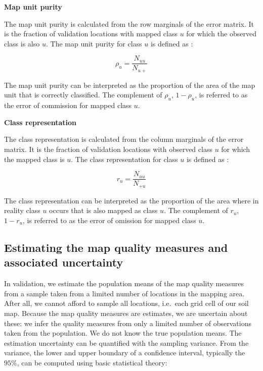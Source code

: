 \documentclass[10pt,b5paper,]{book}
\theoremstyle{definition}
\theoremstyle{definition}
\theoremstyle{definition}
\theoremstyle{remark}
\begin{document}
\textbf{Map unit purity}

The map unit purity is calculated from the row marginals of the error
matrix. It is the fraction of validation locations with mapped class
\(u\) for which the observed class is also \(u\). The map unit purity
for class \(u\) is defined as \citep{brus2011sampling}:

\begin{equation}
\rho_u = \frac{ N_{uu}}{N_{u+}}
\end{equation}

The map unit purity can be interpreted as the proportion of the area of
the map unit that is correctly classified. The complement of \(\rho_u\),
\(1 - \rho_u\), is referred to as the error of commission for mapped
class \(u\).

\textbf{Class representation}

The class representation is calculated from the column marginals of the
error matrix. It is the fraction of validation locations with observed
class \(u\) for which the mapped class is \(u\). The class
representation for class \(u\) is defined as \citep{brus2011sampling}:

\begin{equation}
r_u = \frac{ N_{uu}}{N_{+u}}
\end{equation}

The class representation can be interpreted as the proportion of the
area where in reality class \(u\) occurs that is also mapped as class
\(u\). The complement of \(r_u\), \(1 - r_u\), is referred to as the
error of omission for mapped class \(u\).

\hypertarget{estimating-the-map-quality-measures-and-associated-uncertainty}{%
\subsection{Estimating the map quality measures and associated
uncertainty}\label{estimating-the-map-quality-measures-and-associated-uncertainty}}

In validation, we estimate the population means of the map quality
measures from a sample taken from a limited number of locations in the
mapping area. After all, we cannot afford to sample all locations,
i.e.~each grid cell of our soil map. Because the map quality measures
are estimates, we are uncertain about these: we infer the quality
measures from only a limited number of observations taken from the
population. We do not know the true population means. The estimation
uncertainty can be quantified with the sampling variance. From the
variance, the lower and upper boundary of a confidence interval,
typically the \(95\%\), can be computed using basic statistical theory:
\end{document}
